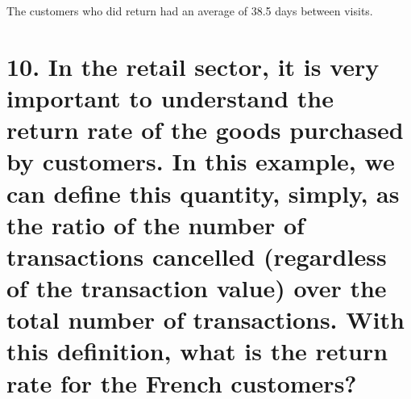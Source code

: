 \documentclass[
]{article}
\begin{document}
The customers who did return had an average of 38.5 days between visits.

\hypertarget{in-the-retail-sector-it-is-very-important-to-understand-the-return-rate-of-the-goods-purchased-by-customers.-in-this-example-we-can-define-this-quantity-simply-as-the-ratio-of-the-number-of-transactions-cancelled-regardless-of-the-transaction-value-over-the-total-number-of-transactions.-with-this-definition-what-is-the-return-rate-for-the-french-customers}{%
\section{10. In the retail sector, it is very important to understand
the return rate of the goods purchased by customers. In this example, we
can define this quantity, simply, as the ratio of the number of
transactions cancelled (regardless of the transaction value) over the
total number of transactions. With this definition, what is the return
rate for the French
customers?}\label{in-the-retail-sector-it-is-very-important-to-understand-the-return-rate-of-the-goods-purchased-by-customers.-in-this-example-we-can-define-this-quantity-simply-as-the-ratio-of-the-number-of-transactions-cancelled-regardless-of-the-transaction-value-over-the-total-number-of-transactions.-with-this-definition-what-is-the-return-rate-for-the-french-customers}}
\end{document}

